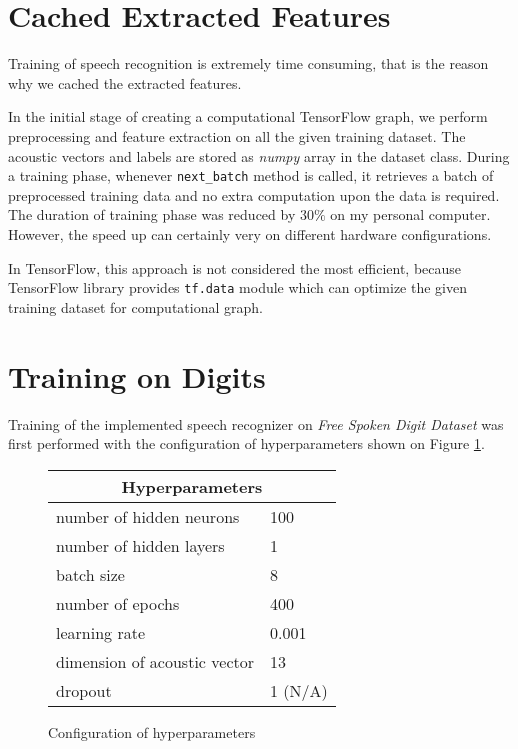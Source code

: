 \section{Cached Extracted Features}

Training of speech recognition is extremely time consuming, that is the reason why we cached the extracted features.

In the initial stage of creating a computational TensorFlow graph, we perform preprocessing and feature extraction on all the given training dataset.
The acoustic vectors and labels are stored as \textit{numpy} array in the dataset class.
During a training phase, whenever \texttt{next\_batch} method is called, it retrieves a batch of preprocessed training data and no extra computation upon the data is required.
The duration of training phase was reduced by $30\%$ on my personal computer. However, the speed up can certainly very on different hardware configurations.

In TensorFlow, this approach is not considered the most efficient, because TensorFlow library provides \texttt{tf.data} module which can optimize the given training dataset for computational graph.

\section{Training on Digits}

Training of the implemented speech recognizer on \textit{Free Spoken Digit Dataset} was first performed with the configuration of hyperparameters shown on Figure \ref{conf1}.

\begin{figure}
	\centering
	\begin{tabular}{ |l|l| }
  	\hline
  	\multicolumn{2}{|c|}{Hyperparameters} \\
  	\hline
  	number of hidden neurons & 100 \\
  	number of hidden layers & 1 \\
  	batch size & 8 \\
  	number of epochs & 400 \\
  	learning rate & 0.001 \\
  	dimension of acoustic vector & 13 \\
  	dropout & 1 (N/A) \\
  	\hline
	\end{tabular}
	\caption{Configuration of hyperparameters} \label{conf1}
\end{figure}

